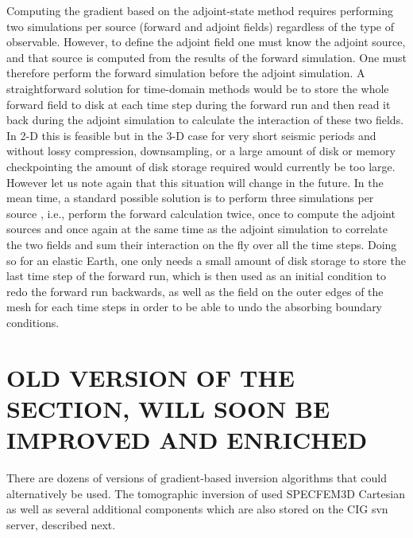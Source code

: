 Computing the gradient based on the adjoint-state method requires performing two simulations per source (forward and adjoint
fields) regardless of the type of observable. However, to define the adjoint field one
must know the adjoint source, and that source is computed from the results of the forward simulation. One must therefore perform
the forward simulation before the adjoint simulation.
A straightforward solution for time-domain methods would be to store the whole forward field to disk at
each time step during the forward run and then read it back during the adjoint simulation to calculate the interaction of these two fields.
In 2-D this is feasible but in the 3-D case for very short seismic periods and without lossy compression, downsampling,
or a large amount of disk or memory checkpointing \cite[e.g.,][]{FiKeIg09,RuHaPuGu14,CyShWi15}
the amount of disk storage required would currently be too large.
However let us note again that this situation will change in the future.
In the mean time, a standard possible solution is to perform three simulations per source \cite[]{TrKoLi08,PeKoLuMaLeCaLeMaLiBlNiBaTr11},
i.e., perform the forward calculation twice, once to compute the adjoint sources and once again
at the same time as the adjoint simulation to correlate the two fields and sum their interaction on the fly over all the time steps.
Doing so for an elastic Earth, one only needs a small amount of disk storage to store the last time
step of the forward run, which is then used as an initial condition to redo the forward run backwards,
as well as the field on the outer edges of the mesh for each time steps in order to be able to undo the absorbing boundary conditions.

\section{OLD VERSION OF THE SECTION, WILL SOON BE IMPROVED AND ENRICHED}

There are dozens of versions of gradient-based inversion
algorithms that could alternatively be used. The tomographic inversion
of \citet{TaLiMaTr09,TaLiMaTr2010} used SPECFEM3D Cartesian as well
as several additional components which are also stored on the CIG
svn server, described next.

